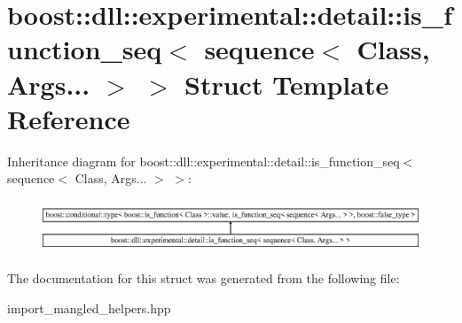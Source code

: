 \hypertarget{a00171}{}\section{boost\+:\+:dll\+:\+:experimental\+:\+:detail\+:\+:is\+\_\+function\+\_\+seq$<$ sequence$<$ Class, Args... $>$ $>$ Struct Template Reference}
\label{a00171}
Inheritance diagram for boost\+:\+:dll\+:\+:experimental\+:\+:detail\+:\+:is\+\_\+function\+\_\+seq$<$ sequence$<$ Class, Args... $>$ $>$\+:\begin{figure}[H]
\begin{center}
\leavevmode
\includegraphics[height=1.600000cm]{a00171}
\end{center}
\end{figure}


The documentation for this struct was generated from the following file\+:\begin{DoxyCompactItemize}
\item 
import\+\_\+mangled\+\_\+helpers.\+hpp\end{DoxyCompactItemize}
